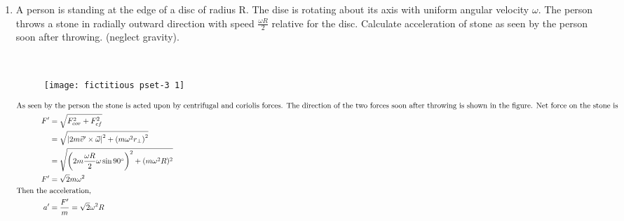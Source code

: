 \begin{enumerate} [label=\color{ocre}\textbf{\arabic*.}]
\begin{answer}
\begin{align*}
	&\simeq 1.70 \mathrm{~N} \\
	\text { Gravitational force }&=m g=50 \times 9.8\\
	&=490 \mathrm{~N}
	\intertext{Since centrifugal force due to spinning of earth is very small compared to the gravitational force due to this reason we do not feel the rotation of earth.}
	\end{align*}
\end{answer}
\item A person is standing at the edge of a disc of radius $\mathrm{R}$. The dise is rotating about its axis with uniform angular velocity $\omega .$ The person throws a stone in radially outward direction with speed $\frac{\omega R}{2}$ relative for the disc. Calculate acceleration of stone as seen by the person soon after throwing. (neglect gravity).
\begin{answer} $\left. \right. $\\
	\begin{figure}[H]
		\centering
		\texttt{[image: fictitious pset-3 1]}
	\end{figure}
	\begin{align*}
	\intertext{As seen by the person the stone is acted upon by centrifugal and coriolis forces. The direction of the two forces soon after throwing is shown in the figure. Net force on the stone is}
	F^{\prime}&=\sqrt{F_{c o r}^{2}+F_{c f}^{2}} \\
	&=\sqrt{\left|2 m \vec{v}^{\prime} \times \vec{\omega}\right|^{2}+\left(m \omega^{2} r_{\perp}\right)^{2}}\\&=\sqrt{\left(2 m \frac{\omega R}{2} \omega \sin 90^{\circ}\right)^{2}+ (m \omega^{2}R )^{2}} \\
	F^{\prime}&=\sqrt{2} m \omega^{2} \\
	\text{Then the }&\text{acceleration,}\\
	a^{\prime}&=\frac{F^{\prime}}{m}=\sqrt{2} \omega^{2} R
	\end{align*}
\end{answer}
\end{enumerate}